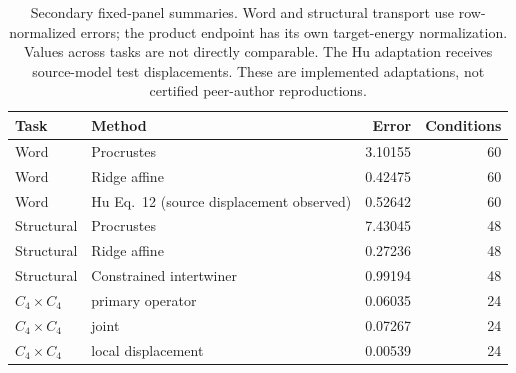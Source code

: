 \begin{table}[htbp]
\caption{Secondary fixed-panel summaries. Word and structural transport use row-normalized errors; the product endpoint has its own target-energy normalization. Values across tasks are not directly comparable. The Hu adaptation receives source-model test displacements. These are implemented adaptations, not certified peer-author reproductions.}
\label{tab:reproduction-secondary}\centering\small
\begin{tabular}{llrr}\toprule
Task & Method & Error & Conditions \\
\midrule
Word & Procrustes & 3.10155 & 60 \\
Word & Ridge affine & 0.42475 & 60 \\
Word & Hu Eq.~12 (source displacement observed) & 0.52642 & 60 \\
Structural & Procrustes & 7.43045 & 48 \\
Structural & Ridge affine & 0.27236 & 48 \\
Structural & Constrained intertwiner & 0.99194 & 48 \\
$C_4\times C_4$ & primary operator & 0.06035 & 24 \\
$C_4\times C_4$ & joint & 0.07267 & 24 \\
$C_4\times C_4$ & local displacement & 0.00539 & 24 \\
\bottomrule\end{tabular}
\end{table}
